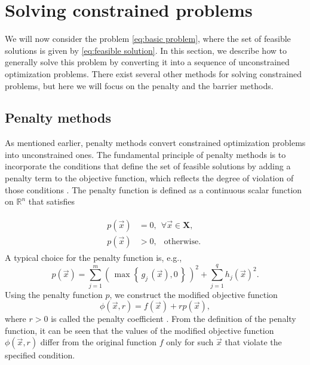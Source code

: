 \section{Solving constrained problems}\label{constrained}
We will now consider the problem \ref{eq:basic problem}, where the set of feasible solutions is given by \ref{eq:feasible solution}. In this section, we describe how to generally solve this problem by converting it into a sequence of unconstrained optimization problems. There exist several other methods for solving constrained problems, but here we will focus on the penalty and the barrier methods.

\subsection{Penalty methods}\label{penalty method}
As mentioned earlier, penalty methods convert constrained optimization problems into unconstrained ones. The fundamental principle of penalty methods is to incorporate the conditions that define the set of feasible solutions by adding a penalty term to the objective function, which reflects the degree of violation of those conditions \cite{Bert}. The penalty function is defined as a continuous scalar function on $ \mathbb{R}^n $ that satisfies

\begin{align}
	\begin{split}
		p(\vec{x}) &= 0, \ \ \forall \vec{x} \in \mathbf{X},\\[6pt]
		p(\vec{x}) &> 0, \ \ \text { otherwise. }
	\end{split}
\end{align}
A typical choice for the penalty function is, e.g.,
\begin{equation}\label{eq:penalty function}
	p (\vec{x}) = \sum_{j=1}^{m} \left( \, \max  \left\{ \, g_j \, (\vec{x}), 0 \, \right\} \, \right)^2 + \sum_{j=1}^{q} h_j (\vec{x})^2.
\end{equation}
Using the penalty function $ p $, we construct the modified objective function
\begin{equation}\label{eq:cost function with penalty}
	\phi (\vec{x}, r) = f (\vec{x}) + r p(\vec{x}),
\end{equation}
where $ r > 0 $ is called the penalty coefficient \cite{Bert}. From the definition of the penalty function, it can be seen that the values of the modified objective function $ \phi (\vec{x}, r)$ differ from the original function $ f $ only for such $ \vec{x} $ that violate the specified condition.

